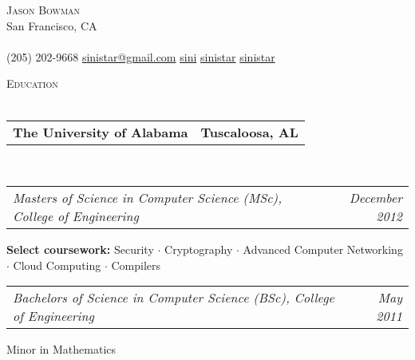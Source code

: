 \documentclass[10pt,letterpaper]{article}
\makeatletter
\newcommand{\area}[2]{\textbf{#1:}   #2}
\newcommand{\lineunder}{\vspace*{-8pt} \\ \hspace*{-18pt} \hrulefill \\}
\newcommand{\header}[1]{{\hspace*{-15pt}\vspace*{6pt} \textsc{#1}} \vspace*{-6pt} \lineunder}
\newcommand{\contact}[3]{
\vspace*{-8pt}
\begin{center}
{\LARGE \scshape {#1}}\\
#2 \lineunder 
#3
\end{center}
\vspace*{-8pt}
}
\newcommand{\headerrow}[2]
{\begin{tabular*}{\linewidth}{l@{\extracolsep{\fill}}r}
	#1 &
	#2 \\
\end{tabular*}}
\newcommand{\education}[5]{
	\headerrow
		{\textbf{#1}}
		{\textbf{#2}}
	\\
	\headerrow
		{\emph{#3}}
		{\emph{#4}}
    #5
}
\makeatother
\begin{document}
\small
\smallskip
\vspace*{-30pt}

\contact{Jason Bowman}
{San Francisco, CA}
{\faPhone \hspace{0.1em} (205) 202-9668 \hspace{0.1em} \faEnvelope \hspace{0.1em}
  \href{mailto:sinistar@gmail.com}{sinistar@gmail.com} \hspace{0.1em} \faGithub \hspace{0.1em} \href{https://www.github.com/sini}{sini} \hspace{0.1em} \faTwitter
  \hspace{0.1em} \href{https://www.twitter.com/sinistar}{sinistar} \hspace{0.1em} \faLinkedin \hspace{0.1em}
  \href{https://linkedin.com/in/sinistar}{sinistar}}

\vspace*{3pt}

\header{Education}
\education{The University of Alabama}{Tuscaloosa, AL}{Masters of Science in
  Computer Science (MSc), College of Engineering}{December 2012}{
	\begin{itemize*}
		\item \area{Select
    coursework}{Security $\cdot$ Cryptography $\cdot$ Advanced Computer
    Networking $\cdot$ Cloud Computing $\cdot$ Compilers}
	\end{itemize*}
	\headerrow{\emph{Bachelors of Science in Computer Science (BSc), College of
      Engineering}}{\emph{May 2011}}
	\begin{itemize*}
  \item Minor in Mathematics
	\end{itemize*}
}


\vspace*{3pt}
\end{document}
